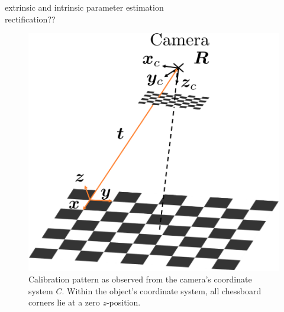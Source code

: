 \cite{zhang2000flexible} extrinsic and intrinsic parameter estimation \\
\cite{loop1999computing} rectification??\\
\begin{figure}[h]
	\centering
	\includegraphics[scale=.28]{chapters/03_background/img/calibration_process.png}
	\caption{Calibration pattern as observed from the camera's coordinate system $C$. Within the object's coordinate system, all chessboard corners lie at a zero $z$-position.}
	\label{fig::323_calibration_process}
\end{figure}
